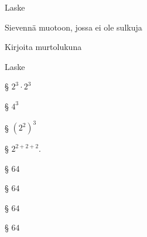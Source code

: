 \begin{tehtavasivu}
\begin{tehtava}
  		Laske
        \begin{vastaus}
        \end{vastaus}
\end{tehtava}

        \begin{tehtava}
    Sievennä muotoon, jossa ei ole sulkuja
        \begin{vastaus}
        \end{vastaus}
    \end{tehtava}

        \begin{tehtava}
  		Kirjoita murtolukuna
       \begin{vastaus}
        \end{vastaus}
    \end{tehtava}

   \begin{tehtava}
        Laske
       
§ $2^3\cdot2^3$
       
§ $4^3$
       
§ $(2^2)^3$
       
§ $2^{2+2+2}$.

        \begin{vastaus}
           
§ $64$
           
§ $64$
           
§ $64$
           
§ $64$
        \end{vastaus}
    \end{tehtava}
    

\end{tehtavasivu}
